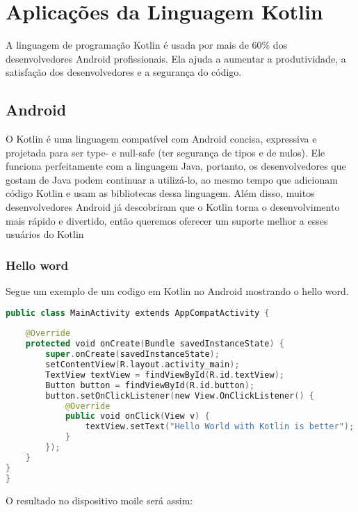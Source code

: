 

\chapter{ Aplica\c{c}\~{o}es da Linguagem Kotlin}
A linguagem de programação Kotlin é usada por mais de 60\% dos desenvolvedores Android profissionais. Ela ajuda a aumentar a produtividade, a satisfação dos desenvolvedores e a segurança do código.

\section{Android}
O Kotlin é uma linguagem compatível com Android concisa,
expressiva e projetada para ser type- e null-safe (ter segurança de tipos e de nulos). Ele funciona perfeitamente com a linguagem Java, portanto, os desenvolvedores que gostam de Java podem continuar a utilizá-lo, ao mesmo tempo que adicionam código Kotlin e usam as bibliotecas dessa linguagem. Além disso, muitos desenvolvedores Android já descobriram que o Kotlin torna o desenvolvimento mais rápido e divertido, então queremos oferecer um suporte melhor a esses usuários do Kotlin

\subsection{Hello word}
Segue um exemplo de um codigo em Kotlin no Android
mostrando o hello word.
\begin{lstlisting}[label={lst:example1}, language=Kotlin]
  public class MainActivity extends AppCompatActivity {
 
    @Override
    protected void onCreate(Bundle savedInstanceState) {
        super.onCreate(savedInstanceState);
        setContentView(R.layout.activity_main);
        TextView textView = findViewById(R.id.textView);
        Button button = findViewById(R.id.button);
        button.setOnClickListener(new View.OnClickListener() {
            @Override
            public void onClick(View v) {
                textView.setText("Hello World with Kotlin is better");
            }
        });
    }
}
}   
\end{lstlisting}


O resultado no dispositivo moile será assim:

